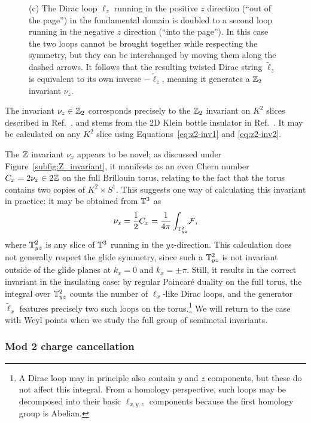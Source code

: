 \begin{figure}[htb!]
{		(c) The Dirac loop $\ell_z$ running in the positive $z$ direction (``out of the page'') in the fundamental domain is doubled to a second loop running in the negative $z$ direction (``into the page''). In this case the two loops cannot be brought together while respecting the symmetry, but they can be interchanged by moving them along the dashed arrows. It follows that the resulting twisted Dirac string $\tilde{\ell}_z$ is equivalent to its own inverse $-\tilde{\ell}_z$, meaning it generates a $\mathbb{Z}_2$ invariant $\nu_z$.}
	\label{fig:K2S1_invariants}
\end{figure}

The invariant $\nu_z\in\mathbb{Z}_2$ corresponds precisely to the $\mathbb{Z}_2$ invariant on $K^2$ slices described in Ref.~\cite{Fonseca-Vaidya_nonorientable}, and stems from the 2D Klein bottle insulator in Ref.~\cite{CYZ_Klein-gauge}. It may be calculated on any $K^2$ slice using Equations~\eqref{eq:z2-inv1} and \eqref{eq:z2-inv2}. 

The $\mathbb{Z}$ invariant $\nu_x$ appears to be novel; as discussed under Figure~\ref{subfig:Z_invariant}, it manifests as an even Chern number $C_x = 2\nu_x\in 2\mathbb{Z}$ on the full Brillouin torus, relating to the fact that the torus contains two copies of $K^2\times S^1$. This suggests one way of calculating this invariant in practice: it may be obtained from $\mathbb{T}^3$ as
\begin{equation}\label{eq:z-invariant1}
	\nu_x = \frac{1}{2}C_x = \frac{1}{4\pi}\int_{\mathbb{T}_{yz}^2}\!\mathcal{F},
\end{equation}
where $\mathbb{T}_{yz}^2$ is any slice of $\mathbb{T}^3$ running in the $yz$-direction. This calculation does not generally respect the glide symmetry, since such a $\mathbb{T}_{yz}^2$ is not invariant outside of the glide planes at $k_x=0$ and $k_x = \pm\pi$. Still, it results in the correct invariant in the insulating case: by regular Poincaré duality on the full torus, the integral over $\mathbb{T}_{yz}^2$ counts the number of $\ell_x$-like Dirac loops, and the generator $\tilde{\ell}_x$ features precisely two such loops on the torus.\footnote{
	A Dirac loop may in principle also contain $y$ and $z$ components, but these do not affect this integral. From a homology perspective, such loops may be decomposed into their basic $\ell_{x,y,z}$ components because the first homology group is Abelian.}
We will return to the case with Weyl points when we study the full group of semimetal invariants.

\subsubsection{Mod 2 charge cancellation}

